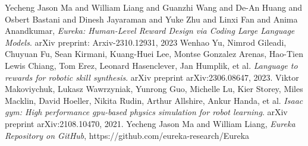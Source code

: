 \documentclass[10pt,twocolumn]{article}
\begin{document}
\begin{thebibliography}{9}
Yecheng Jason Ma and William Liang and Guanzhi Wang and De-An Huang and Osbert Bastani and Dinesh Jayaraman and Yuke Zhu and Linxi Fan and Anima Anandkumar, \emph{Eureka: Human-Level Reward Design via Coding Large Language Models}. arXiv preprint: Arxiv-2310.12931, 2023
Wenhao Yu, Nimrod Gileadi, Chuyuan Fu, Sean Kirmani, Kuang-Huei Lee, Montse Gonzalez Arenas, Hao-Tien Lewis Chiang, Tom Erez, Leonard Hasenclever, Jan Humplik, et al. \emph{Language to rewards for robotic skill synthesis}. arXiv preprint arXiv:2306.08647, 2023.
Viktor Makoviychuk, Lukasz Wawrzyniak, Yunrong Guo, Michelle Lu, Kier Storey, Miles Macklin,
David Hoeller, Nikita Rudin, Arthur Allshire, Ankur Handa, et al. \emph{Isaac gym: High performance
gpu-based physics simulation for robot learning}. arXiv preprint arXiv:2108.10470, 2021.
Yecheng Jason Ma and William Liang, \emph{Eureka Repository on GitHub}, https://github.com/eureka-research/Eureka
\end{thebibliography}
\end{document}
